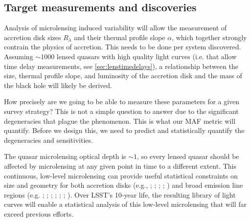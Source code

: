 \subsection{Target measurements and discoveries}
\label{sec:\secname:targets}

Analysis of microlensing induced variability will allow the measurement of
accretion disk sizes $R_\lambda$ and their thermal profile slope $\alpha$,
which together strongly contrain the physics of accretion.
This needs to be done per system discovered. Assuming $\sim$1000 lensed quasars with
high quality light curves (i.e. that allow time delay measurements, see
\autoref{sec:lenstimedelays}), a relationship between the size, thermal profile
slope, and luminosity of the accretion disk and the mass of the black hole
will likely be derived.

How precisely are we going to be able to measure these parameters for a given
survey strategy? This is not a simple question to answer due to the significant
degeneracies that plague the phenomenon. This is what our MAF metric will
quantify. Before we design this, we need to predict and statistically quantify
the degeneracies and sensitivities.


The quasar microlensing optical depth is $\sim1$, so every lensed quasar should
be affected by microlensing at any given point in time to a different extent.
This continuous, low-level microlensing can provide useful statistical constraints on
size and geometry for both accretion disks (e.g., \citealt{kochanek2004}; \citealt{bate2008}; \citealt{floyd2009}; \citealt{blackburne2011,blackburne2014}; \citealt{jimenez2014}) and
broad emission line regions  (e.g. ; \citealt{kochanek2004}; \citealt{richards2004}; \citealt{wayth2005}; \citealt{sluse2011}; \citealt{odowd2011}; \citealt{guerras2013}). Over LSST's 10-year life,
the resulting library of light curves will enable a statistical analysis of this
low-level microlensing that will far exceed previous efforts.

